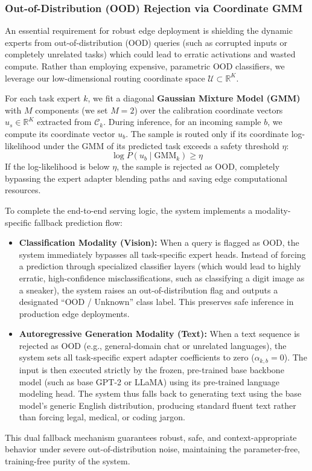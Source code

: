 \subsubsection{Out-of-Distribution (OOD) Rejection via Coordinate GMM}
An essential requirement for robust edge deployment is shielding the dynamic experts from out-of-distribution (OOD) queries (such as corrupted inputs or completely unrelated tasks) which could lead to erratic activations and wasted compute.
Rather than employing expensive, parametric OOD classifiers, we leverage our low-dimensional routing coordinate space $\mathcal{U} \subset \mathbb{R}^K$.

For each task expert $k$, we fit a diagonal \textbf{Gaussian Mixture Model (GMM)} with $M$ components (we set $M=2$) over the calibration coordinate vectors $u_s \in \mathbb{R}^K$ extracted from $\mathcal{C}_k$. 
During inference, for an incoming sample $b$, we compute its coordinate vector $u_b$. The sample is routed only if its coordinate log-likelihood under the GMM of its predicted task exceeds a safety threshold $\eta$:
\begin{equation}
    \log P(u_b \mid \text{GMM}_k) \ge \eta
\end{equation}
If the log-likelihood is below $\eta$, the sample is rejected as OOD, completely bypassing the expert adapter blending paths and saving edge computational resources. 

To complete the end-to-end serving logic, the system implements a modality-specific fallback prediction flow:
\begin{itemize}
    \item \textbf{Classification Modality (Vision):} When a query is flagged as OOD, the system immediately bypasses all task-specific expert heads. Instead of forcing a prediction through specialized classifier layers (which would lead to highly erratic, high-confidence misclassifications, such as classifying a digit image as a sneaker), the system raises an out-of-distribution flag and outputs a designated ``OOD / Unknown'' class label. This preserves safe inference in production edge deployments.
    \item \textbf{Autoregressive Generation Modality (Text):} When a text sequence is rejected as OOD (e.g., general-domain chat or unrelated languages), the system sets all task-specific expert adapter coefficients to zero ($\alpha_{k,b} = 0$). The input is then executed strictly by the frozen, pre-trained base backbone model (such as base GPT-2 or LLaMA) using its pre-trained language modeling head. The system thus falls back to generating text using the base model's generic English distribution, producing standard fluent text rather than forcing legal, medical, or coding jargon.
\end{itemize}
This dual fallback mechanism guarantees robust, safe, and context-appropriate behavior under severe out-of-distribution noise, maintaining the parameter-free, training-free purity of the system.

